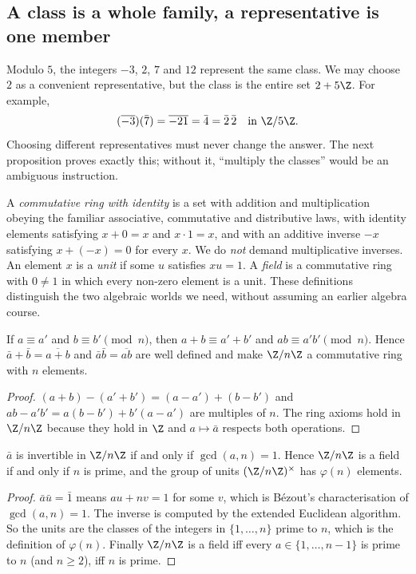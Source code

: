 \subsection*{A class is a whole family, a representative is one member}
Modulo $5$, the integers $-3$, $2$, $7$ and $12$ represent the same class. We may choose $2$ as a convenient representative, but the class is the entire set $2+5\Z$. For example,
\[
(\overline{-3})(\bar7)=\overline{-21}=\bar4
 =\bar2\,\bar2\quad\text{in }\Z/5\Z.
\]
Choosing different representatives must never change the answer. The next proposition proves exactly this; without it, ``multiply the classes'' would be an ambiguous instruction.

A \emph{commutative ring with identity} is a set with addition and multiplication obeying the familiar associative, commutative and distributive laws, with identity elements satisfying $x+0=x$ and $x\cdot1=x$, and with an additive inverse $-x$ satisfying $x+(-x)=0$ for every $x$. We do \emph{not} demand multiplicative inverses. An element $x$ is a \emph{unit} if some $u$ satisfies $xu=1$. A \emph{field} is a commutative ring with $0\ne1$ in which every non-zero element is a unit. These definitions distinguish the two algebraic worlds we need, without assuming an earlier algebra course.

\begin{proposition}\label{prop:ringZn}
If $a\equiv a'$ and $b\equiv b'\pmod n$, then $a+b\equiv a'+b'$ and $ab\equiv a'b'\pmod n$. Hence $\bar a+\bar b=\overline{a+b}$ and $\bar a\bar b=\overline{ab}$ are well defined and make $\Z/n\Z$ a commutative ring with $n$ elements.
\end{proposition}
\begin{proof}
$(a+b)-(a'+b')=(a-a')+(b-b')$ and $ab-a'b'=a(b-b')+b'(a-a')$ are multiples of $n$. The ring axioms hold in $\Z/n\Z$ because they hold in $\Z$ and $a\mapsto\bar a$ respects both operations.
\end{proof}

\begin{proposition}\label{prop:units}
$\bar a$ is invertible in $\Z/n\Z$ if and only if $\gcd(a,n)=1$. Hence $\Z/n\Z$ is a field if and only if $n$ is prime, and the group of units $(\Z/n\Z)^\times$ has $\varphi(n)$ elements.
\end{proposition}
\begin{proof}
$\bar a\bar u=\bar1$ means $au+nv=1$ for some $v$, which is B\'ezout's characterisation of $\gcd(a,n)=1$. The inverse is computed by the extended Euclidean algorithm. So the units are the classes of the integers in $\{1,\dots,n\}$ prime to $n$, which is the definition of $\varphi(n)$. Finally $\Z/n\Z$ is a field iff every $a\in\{1,\dots,n-1\}$ is prime to $n$ (and $n\ge2$), iff $n$ is prime.
\end{proof}

